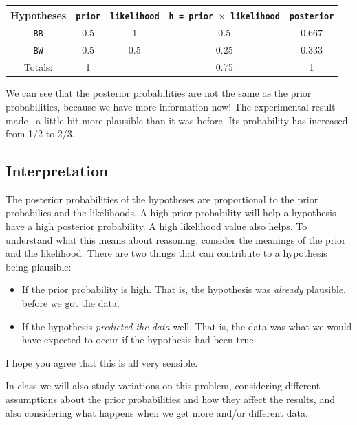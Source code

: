 \begin{table}[h!]
\begin{center}
\begin{tabular}{|c|c|c|c|c|}
\hline
{\bf Hypotheses} & {\tt prior} & {\tt likelihood} &
{\tt h = prior $\times$ likelihood} & {\tt posterior}\\
\hline
{\tt BB} & 0.5 & 1 & 0.5 & 0.667\\
{\tt BW} & 0.5 & 0.5 & 0.25  & 0.333\\
\hline
Totals: & 1 & & 0.75 & 1\\
\hline
\end{tabular}
\end{center}
\end{table}
We can see that the posterior probabilities are not the same as the prior
probabilities, because we have more information now! The experimental result
made \bb~a little bit more plausible than it was before. Its probability has
increased from 1/2 to 2/3.

\subsection{Interpretation}
The posterior probabilities of the hypotheses are proportional to the prior probabilies
and the likelihoods. A high prior probability will help a hypothesis have a high
posterior probability. A high likelihood value also helps.
To understand what this means about reasoning, consider
the meanings of the prior and the likelihood. There are two things that can
contribute to a hypothesis being plausible:
\begin{itemize}
\item If the prior probability is high. That is, the hypothesis was {\it already}
plausible, before we got the data.
\item If the hypothesis {\it predicted the data} well. That is, the data was
what we would have expected to occur if the hypothesis had been true.
\end{itemize}
I hope you agree that this is all very sensible.

In class we will also study
variations on this problem, considering different assumptions about the prior
probabilities and how they affect the results, and also considering what happens
when we get more and/or different data.

